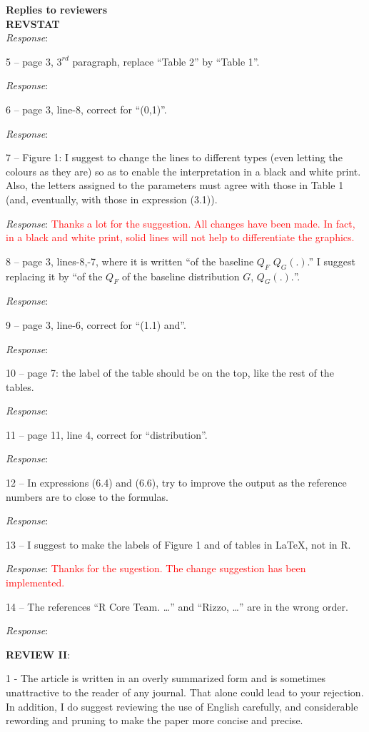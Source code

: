 \documentclass[version=last,12pt,{"/home/prdm0/R/x86_64-pc-linux-gnu-library/4.2/komaletter/rmarkdown/templates/pdf/resources/maintainersDelight"},letterpaper,]{scrlttr2}
\begin{document}
\begin{letter}{\textbf{Replies to reviewers}\\\textbf{REVSTAT}\\}
\emph{Response}:

5 -- page 3, \(3^{rd}\) paragraph, replace ``Table 2'' by ``Table 1''.

\emph{Response}:

6 -- page 3, line-8, correct for ``(0,1)''.

\emph{Response}:

7 -- Figure 1: I suggest to change the lines to different types (even
letting the colours as they are) so as to enable the interpretation in a
black and white print. Also, the letters assigned to the parameters must
agree with those in Table 1 (and, eventually, with those in expression
(3.1)).

\emph{Response}:
\textcolor{red}{Thanks a lot for the suggestion. All changes have been made. In fact, in a black and white print, solid lines will not help to differentiate the graphics.}

8 -- page 3, lines-8,-7, where it is written ``of the baseline \(Q_F\)
\(Q_G(.)\).'' I suggest replacing it by ``of the \(Q_F\) of the baseline
distribution \(G\), \(Q_G(.).\)''.

\emph{Response}:

9 -- page 3, line-6, correct for ``(1.1) and''.

\emph{Response}:

10 -- page 7: the label of the table should be on the top, like the rest
of the tables.

\emph{Response}:

11 -- page 11, line 4, correct for ``distribution''.

\emph{Response}:

12 -- In expressions (6.4) and (6.6), try to improve the output as the
reference numbers are to close to the formulas.

\emph{Response}:

13 -- I suggest to make the labels of Figure 1 and of tables in \LaTeX,
not in R.

\emph{Response}:
\textcolor{red}{Thanks for the sugestion. The change suggestion has been implemented.}

14 -- The references ``R Core Team. \ldots{}'' and ``Rizzo, \ldots{}''
are in the wrong order.

\emph{Response}:

\textbf{REVIEW II}:

1 - The article is written in an overly summarized form and is sometimes
unattractive to the reader of any journal. That alone could lead to your
rejection. In addition, I do suggest reviewing the use of English
carefully, and considerable rewording and pruning to make the paper more
concise and precise.


\end{letter}
\end{document}
